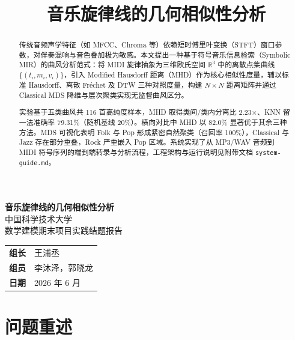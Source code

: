 \documentclass[withoutpreface]{cumcmthesis}
\title{音乐旋律线的几何相似性分析}
\begin{document}
\maketitle

\begin{center}
    {\bfseries\songti 音乐旋律线的几何相似性分析}\\[0.8cm]
    {\kaishu 中国科学技术大学}\\[0.3cm]
    {\songti 数学建模期末项目实践结题报告}\\[1.2cm]
    \begin{tabular}{rl}
        \textbf{组长} & 王浦丞 \\
        \textbf{组员} & 李沐泽，郭晓龙 \\
        \textbf{日期} & 2026 年 6 月 \\
    \end{tabular}
\end{center}

\newpage

\begin{abstract}
传统音频声学特征（如 MFCC、Chroma 等）依赖短时傅里叶变换（STFT）窗口参数，对伴奏混响与音色叠加极为敏感。本文提出一种基于符号音乐信息检索（Symbolic MIR）的曲风分析范式：将 MIDI 旋律抽象为三维欧氏空间 $\mathbb{R}^3$ 中的离散点集曲线 $\{(t_i, m_i, v_i)\}$，引入 Modified Hausdorff 距离（MHD）作为核心相似性度量，辅以标准 Hausdorff、离散 Fr\'{e}chet 及 DTW 三种对照度量，构建 $N \times N$ 距离矩阵并通过 Classical MDS 降维与层次聚类实现无监督曲风区分。

实验基于五类曲风共 116 首高纯度样本，MHD 取得类间/类内分离比 2.23$\times$、KNN 留一法准确率 79.31\%（随机基线 20\%）。横向对比中 MHD 以 82.0\% 显著优于其余三种方法。MDS 可视化表明 Folk 与 Pop 形成紧密自然聚类（召回率 100\%），Classical 与 Jazz 存在部分重叠，Rock 严重嵌入 Pop 区域。系统实现了从 MP3/WAV 音频到 MIDI 符号序列的端到端转录与分析流程，工程架构与运行说明见附带文档 \texttt{system-guide.md}。

\end{abstract}

\tableofcontents

\newpage

\section{问题重述}
\end{document}
